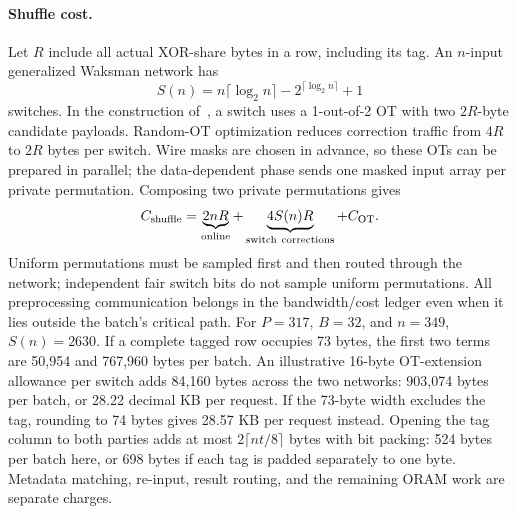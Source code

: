 \documentclass[11pt]{article}
\begin{document}
\paragraph{Shuffle cost.}
Let $R$ include all actual XOR-share bytes in a row, including its tag.
An $n$-input generalized Waksman network has
\[
 S(n)=n\lceil\log_2 n\rceil-2^{\lceil\log_2 n\rceil}+1
\]
switches.  In the construction of~\cite[Appendix A.3.1 and Figure 16]{osn2021},
a switch uses a 1-out-of-2 OT with two $2R$-byte candidate payloads.
Random-OT optimization reduces correction traffic from $4R$ to $2R$
bytes per switch.  Wire masks are chosen in advance, so these OTs can be
prepared in parallel; the data-dependent phase sends one masked input
array per private permutation.  Composing two private permutations gives
\[
 C_{\rm shuffle}=\underbrace{2nR}_{\rm online}
             +\underbrace{4S(n)R}_{\rm switch\ corrections}
             +C_{\rm OT}.
\]
Uniform permutations must be sampled first and then routed through the
network; independent fair switch bits do not sample uniform permutations.
All preprocessing communication belongs in the bandwidth/cost ledger even
when it lies outside the batch's critical path.  For $P=317$, $B=32$, and
$n=349$, $S(n)=2630$.  If a complete tagged row occupies 73 bytes, the first
two terms are 50,954 and 767,960 bytes per batch.  An illustrative 16-byte
OT-extension allowance per switch adds 84,160 bytes across the two
networks: 903,074 bytes per batch, or 28.22 decimal KB per request.  If the
73-byte width excludes the tag, rounding to 74 bytes gives 28.57 KB per
request instead.  Opening the tag column to both parties adds at most
$2\lceil nt/8\rceil$ bytes with bit packing: 524 bytes per batch here,
or 698 bytes if each tag is padded separately to one byte.  Metadata
matching, re-input, result routing, and the remaining ORAM work are
separate charges.
\end{document}
